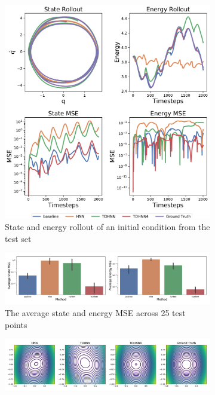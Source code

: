 \documentclass[twoside]{article}
\begin{document}
\begin{figure}[!htb]
\centering
\captionsetup{justification=centering}
\begin{subfigure}[b]{0.48\textwidth}
\includegraphics[width=\textwidth]{figures/figures/relativity/1/relativity_long_0.pdf}
\caption{State and energy rollout of an initial condition from the test set}
\end{subfigure}
\begin{subfigure}[b]{0.48\textwidth}
\includegraphics[width=\textwidth]{figures/figures/relativity/1/relativity_errors_0.pdf}
\caption{The average state and energy MSE across 25 test points}
\end{subfigure}
\begin{subfigure}[b]{0.48\textwidth}
\includegraphics[width=\textwidth]{figures/figures/relativity/1/relativity_ham.pdf}

\end{subfigure}
\end{figure}
\end{document}
